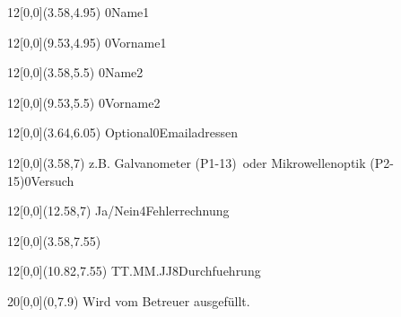 \begin{titlepage}
    \begin{textblock}{12}[0,0](3.58,4.95)
                    {}{0}{Name1}
    \end{textblock}
    \begin{textblock}{12}[0,0](9.53,4.95)
                    {}{0}{Vorname1}
    \end{textblock}

    \begin{textblock}{12}[0,0](3.58,5.5)
                    {}{0}{Name2}
    \end{textblock}
    \begin{textblock}{12}[0,0](9.53,5.5)
                    {}{0}{Vorname2}
    \end{textblock}

    \begin{textblock}{12}[0,0](3.64,6.05)
       \normalsize{}
                              {Optional}{0}{Emailadressen}
    \end{textblock}

    \begin{textblock}{12}[0,0](3.58,7)
                    {z.B. \glqq Galvanometer (P1-13)\grqq\ oder \glqq %
                     Mikrowellenoptik (P2-15)\grqq}{0}{Versuch}
    \end{textblock}
    \begin{textblock}{12}[0,0](12.58,7)
                   {Ja/Nein}{4}{Fehlerrechnung}
    \end{textblock}

    \begin{textblock}{12}[0,0](3.58,7.55)
    \end{textblock}
    \begin{textblock}{12}[0,0](10.82,7.55)
                    {TT.MM.JJ}{8}{Durchfuehrung}
    \end{textblock}

    \begin{textblock}{20}[0,0](0,7.9)\tiny\centering
        Wird vom Betreuer ausgefüllt.
    \end{textblock}


\end{titlepage}
